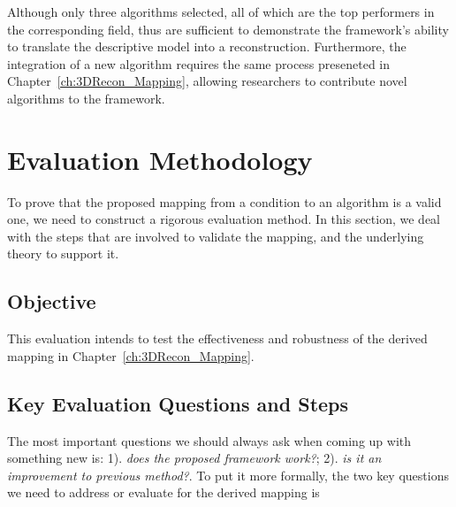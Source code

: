Although only three algorithms selected, all of which are the top performers in the corresponding field, thus are sufficient to demonstrate the framework's ability to translate the descriptive model into a reconstruction. Furthermore, the integration of a new algorithm requires the same process preseneted in Chapter~\ref{ch:3DRecon_Mapping}, allowing researchers to contribute novel algorithms to the framework.

\section{Evaluation Methodology}
To prove that the proposed mapping from a condition to an algorithm is a valid one, we need to construct a rigorous evaluation method. In this section, we deal with the steps that are involved to validate the mapping, and the underlying theory to support it.

\subsection{Objective}
This evaluation intends to test the effectiveness and robustness of the derived mapping in Chapter~\ref{ch:3DRecon_Mapping}.



\subsection{Key Evaluation Questions and Steps}

The most important questions we should always ask when coming up with something new is: 1). \textit{does the proposed framework work?}; 2). \textit{is it an improvement to previous method?}. To put it more formally, the two key questions we need to address or evaluate for the derived mapping is

